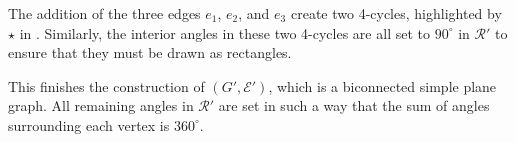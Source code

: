 \documentclass{article}\usepackage[a4paper,margin=20mm]{geometry}
\newcommand{\RR}{\mathcal{R}}
\newcommand{\EE}{\mathcal{E}}
\begin{document}
The addition of the three edges $e_1$, $e_2$, and $e_3$ create two 4-cycles, highlighted by $\star$ in . Similarly, the interior angles in these two 4-cycles  are all set to $90^\circ$ in $\RR'$ to ensure that they must be drawn as rectangles.

This finishes the construction of $(G',\EE')$, which is a biconnected simple plane graph.
All remaining angles in $\RR'$ are set in such a way that the sum of angles surrounding each vertex is $360^\circ$.
\end{document}
